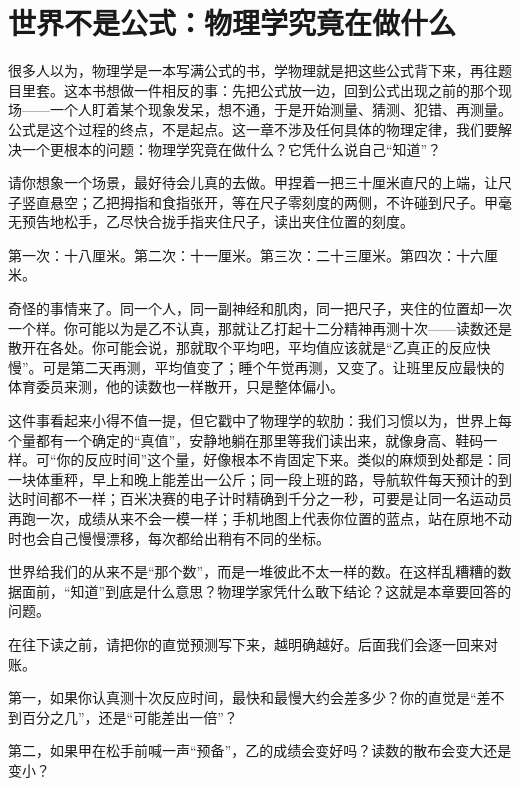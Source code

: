 \chapter{世界不是公式：物理学究竟在做什么}

很多人以为，物理学是一本写满公式的书，学物理就是把这些公式背下来，再往题目里套。这本书想做一件相反的事：先把公式放一边，回到公式出现之前的那个现场——一个人盯着某个现象发呆，想不通，于是开始测量、猜测、犯错、再测量。公式是这个过程的终点，不是起点。这一章不涉及任何具体的物理定律，我们要解决一个更根本的问题：物理学究竟在做什么？它凭什么说自己“知道”？


请你想象一个场景，最好待会儿真的去做。甲捏着一把三十厘米直尺的上端，让尺子竖直悬空；乙把拇指和食指张开，等在尺子零刻度的两侧，不许碰到尺子。甲毫无预告地松手，乙尽快合拢手指夹住尺子，读出夹住位置的刻度。

第一次：十八厘米。第二次：十一厘米。第三次：二十三厘米。第四次：十六厘米。

奇怪的事情来了。同一个人，同一副神经和肌肉，同一把尺子，夹住的位置却一次一个样。你可能以为是乙不认真，那就让乙打起十二分精神再测十次——读数还是散开在各处。你可能会说，那就取个平均吧，平均值应该就是“乙真正的反应快慢”。可是第二天再测，平均值变了；睡个午觉再测，又变了。让班里反应最快的体育委员来测，他的读数也一样散开，只是整体偏小。

这件事看起来小得不值一提，但它戳中了物理学的软肋：我们习惯以为，世界上每个量都有一个确定的“真值”，安静地躺在那里等我们读出来，就像身高、鞋码一样。可“你的反应时间”这个量，好像根本不肯固定下来。类似的麻烦到处都是：同一块体重秤，早上和晚上能差出一公斤；同一段上班的路，导航软件每天预计的到达时间都不一样；百米决赛的电子计时精确到千分之一秒，可要是让同一名运动员再跑一次，成绩从来不会一模一样；手机地图上代表你位置的蓝点，站在原地不动时也会自己慢慢漂移，每次都给出稍有不同的坐标。

世界给我们的从来不是“那个数”，而是一堆彼此不太一样的数。在这样乱糟糟的数据面前，“知道”到底是什么意思？物理学家凭什么敢下结论？这就是本章要回答的问题。


在往下读之前，请把你的直觉预测写下来，越明确越好。后面我们会逐一回来对账。

第一，如果你认真测十次反应时间，最快和最慢大约会差多少？你的直觉是“差不到百分之几”，还是“可能差出一倍”？

第二，如果甲在松手前喊一声“预备”，乙的成绩会变好吗？读数的散布会变大还是变小？

